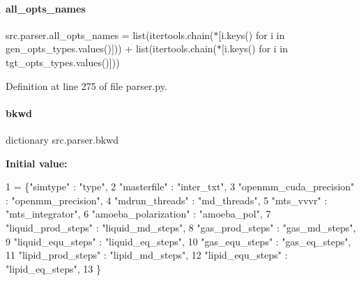 \paragraph{\texorpdfstring{all\+\_\+opts\+\_\+names}{all\_opts\_names}}
{\footnotesize\ttfamily src.\+parser.\+all\+\_\+opts\+\_\+names = list(itertools.\+chain($\ast$\mbox{[}i.\+keys() for i in gen\+\_\+opts\+\_\+types.\+values()\mbox{]})) + list(itertools.\+chain($\ast$\mbox{[}i.\+keys() for i in tgt\+\_\+opts\+\_\+types.\+values()\mbox{]}))}



Definition at line 275 of file parser.\+py.

\mbox{\label{namespacesrc_1_1parser_af3841a74b2abb7963296d90ba62f8cf4}} 
\paragraph{\texorpdfstring{bkwd}{bkwd}}
{\footnotesize\ttfamily dictionary src.\+parser.\+bkwd}

{\bfseries Initial value\+:}
\begin{DoxyCode}
1 =  \{\textcolor{stringliteral}{"simtype"} : \textcolor{stringliteral}{"type"},
2         \textcolor{stringliteral}{"masterfile"} : \textcolor{stringliteral}{"inter\_txt"},
3         \textcolor{stringliteral}{"openmm\_cuda\_precision"} : \textcolor{stringliteral}{"openmm\_precision"},
4         \textcolor{stringliteral}{"mdrun\_threads"} : \textcolor{stringliteral}{"md\_threads"},
5         \textcolor{stringliteral}{"mts\_vvvr"} : \textcolor{stringliteral}{"mts\_integrator"},
6         \textcolor{stringliteral}{"amoeba\_polarization"} : \textcolor{stringliteral}{"amoeba\_pol"},
7         \textcolor{stringliteral}{"liquid\_prod\_steps"} : \textcolor{stringliteral}{"liquid\_md\_steps"},
8         \textcolor{stringliteral}{"gas\_prod\_steps"} : \textcolor{stringliteral}{"gas\_md\_steps"},
9         \textcolor{stringliteral}{"liquid\_equ\_steps"} : \textcolor{stringliteral}{"liquid\_eq\_steps"},
10         \textcolor{stringliteral}{"gas\_equ\_steps"} : \textcolor{stringliteral}{"gas\_eq\_steps"},
11         \textcolor{stringliteral}{"lipid\_prod\_steps"} : \textcolor{stringliteral}{"lipid\_md\_steps"},
12         \textcolor{stringliteral}{"lipid\_equ\_steps"} : \textcolor{stringliteral}{"lipid\_eq\_steps"},
13         \}
\end{DoxyCode}


